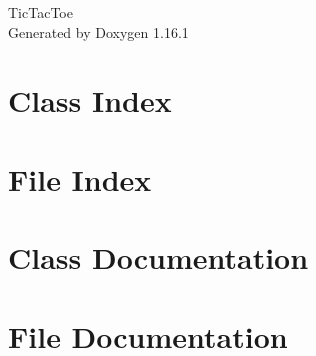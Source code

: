 \documentclass[twoside]{book}
\newcommand{\+}{\discretionary{\mbox{\scriptsize$\hookleftarrow$}}{}{}}
\newcommand{\clearemptydoublepage}{%
    \newpage{\pagestyle{empty}\cleardoublepage}%
  }
\begin{document}
  \raggedbottom
    \hypersetup{pageanchor=false,
                bookmarksnumbered=true,
                pdfencoding=unicode
               }
  \begin{titlepage}
  \vspace*{7cm}
  \begin{center}%
  {\Large Tic\+Tac\+Toe}\\
  \vspace*{1cm}
  {\large Generated by Doxygen 1.16.1}\\
  \end{center}
  \end{titlepage}
  \clearemptydoublepage
  \tableofcontents
  \clearemptydoublepage
  \hypersetup{pageanchor=true}
\chapter{Class Index}

\chapter{File Index}

\chapter{Class Documentation}

\chapter{File Documentation}


  \backmatter
  \newpage
  \clearemptydoublepage
  \printindex
\end{document}

